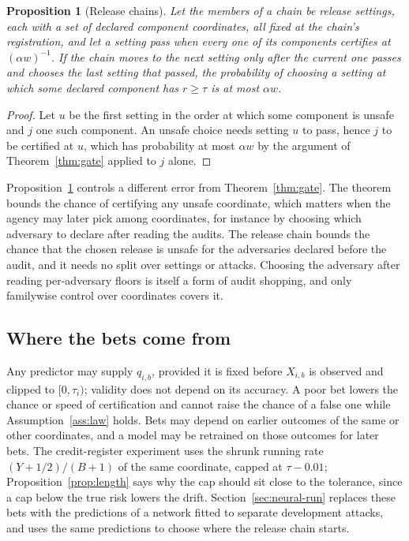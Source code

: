 \documentclass{jpc}
\newtheorem{proposition}[thm]{Proposition}
\theoremstyle{remark}
\begin{document}
\begin{proposition}[Release chains]\label{prop:release}
Let the members of a chain be release settings, each with a set of declared component coordinates, all fixed at the chain's registration, and let a setting pass when every one of its components certifies at $(\alpha w)^{-1}$. If the chain moves to the next setting only after the current one passes and chooses the last setting that passed, the probability of choosing a setting at which some declared component has $r\ge\tau$ is at most $\alpha w$.
\end{proposition}
\begin{proof}
Let $u$ be the first setting in the order at which some component is unsafe and $j$ one such component. An unsafe choice needs setting $u$ to pass, hence $j$ to be certified at $u$, which has probability at most $\alpha w$ by the argument of Theorem~\ref{thm:gate} applied to $j$ alone.
\end{proof}
Proposition~\ref{prop:release} controls a different error from Theorem~\ref{thm:gate}. The theorem bounds the chance of certifying any unsafe coordinate, which matters when the agency may later pick among coordinates, for instance by choosing which adversary to declare after reading the audits. The release chain bounds the chance that the chosen release is unsafe for the adversaries declared before the audit, and it needs no split over settings or attacks. Choosing the adversary after reading per-adversary floors is itself a form of audit shopping, and only familywise control over coordinates covers it.

\subsection{Where the bets come from}\label{sec:bets}
Any predictor may supply $q_{i,b}$, provided it is fixed before $X_{i,b}$ is observed and clipped to $[0,\tau_i)$; validity does not depend on its accuracy. A poor bet lowers the chance or speed of certification and cannot raise the chance of a false one while Assumption~\ref{ass:law} holds. Bets may depend on earlier outcomes of the same or other coordinates, and a model may be retrained on those outcomes for later bets. The credit-register experiment uses the shrunk running rate $(Y+1/2)/(B+1)$ of the same coordinate, capped at $\tau-0.01$; Proposition~\ref{prop:length} says why the cap should sit close to the tolerance, since a cap below the true risk lowers the drift. Section~\ref{sec:neural-run} replaces these bets with the predictions of a network fitted to separate development attacks, and uses the same predictions to choose where the release chain starts.
\end{document}
